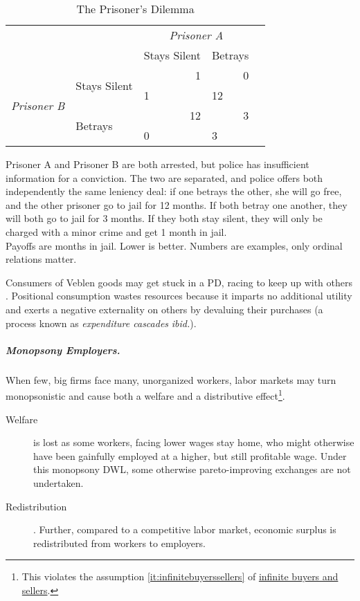 \begin{table}
			\caption{The Prisoner's Dilemma}
			\label{tab:PD}
			\begin{center}
			\begin{tabular}{m{1cm}m{2,3cm}m{}m{}m{}}
				& & \multicolumn{2}{c}{\emph{Prisoner A}} \\
				& &Stays Silent & Betrays\\
				\cline{3-4}
				\multicolumn{1}{c}{\multirow{4}{*}{\emph{Prisoner B}}} & \multirow{2}{}{Stays Silent} & 		\multicolumn{1}{|r|}{1} & \multicolumn{1}{r|}{0}\\
				\multicolumn{1}{c}{} & \multicolumn{1}{c}{}& \multicolumn{1}{|l|}{1} & \multicolumn{1}{l|}{12}\\
				\cline{3-4}
				\multicolumn{1}{c}{} & \multirow{2}{2,3cm}{Betrays} & \multicolumn{1}{|r|}{12} & \multicolumn{1}{r|}{3}\\
				\multicolumn{1}{c}{} & \multicolumn{1}{c}{}& \multicolumn{1}{|l|}{0} & \multicolumn{1}{l|}{3}\\
				\cline{3-4}
			\end{tabular}
			\end{center}
			\scriptsize{Prisoner A and Prisoner B are both arrested, but police has insufficient information for a conviction. The two are separated, and police offers both independently the same leniency deal: if one betrays the other, she will go free, and the other prisoner go to jail for 12 months. If both betray one another, they will both go to jail for 3 months. If they both stay silent, they will only be charged with a minor crime and get 1 month in jail. \\
			Payoffs are months in jail. Lower is better. Numbers are examples, only ordinal relations matter.}
		\end{table}


Consumers of Veblen goods may get stuck in a \gls{PD}, racing to keep up with others \citep{Frank1987}. Positional consumption wastes resources because it imparts no additional utility and exerts a negative externality on others by devaluing their purchases (a process known as \emph{expenditure cascades} \emph{ibid.}).

\subparagraph[Monopsony Employers]{Monopsony Employers.} \label{sec:monopsonyemployers} When few, big firms face many, unorganized workers, labor markets may turn monopsonistic and cause both a welfare and a distributive effect\footnote{
	This violates the  assumption \ref{it:infinitebuyerssellers} of \hyperref[it:infinitebuyerssellers]{infinite buyers and sellers}.}.
\begin{description}
	\item[Welfare] is lost as some workers, facing lower wages stay home, who might otherwise have been gainfully employed at a higher, but still profitable wage. Under this monopsony \gls{DWL}, some otherwise pareto-improving exchanges are not undertaken.
	\item[Redistribution]. Further, compared to a competitive labor market, economic surplus is redistributed from workers to employers.
\end{description}

